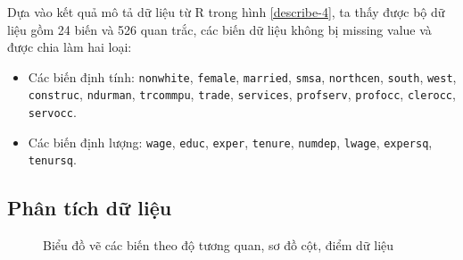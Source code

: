 Dựa vào kết quả mô tả dữ liệu từ R trong hình \ref{describe-4}, ta thấy được bộ dữ liệu gồm  24 biến và 526 quan trắc, các biến dữ liệu không bị missing value và được chia làm hai loại:
\begin{itemize}
	\item Các biến định tính: \texttt{nonwhite}, \texttt{female}, \texttt{married}, \texttt{smsa}, \texttt{northcen}, \texttt{south}, \texttt{west}, \texttt{construc}, \texttt{ndurman}, \texttt{trcommpu}, \texttt{trade}, \texttt{services}, \texttt{profserv}, \texttt{profocc}, \texttt{clerocc}, \texttt{servocc}.
	\item Các biến định lượng: \texttt{wage}, \texttt{educ}, \texttt{exper}, \texttt{tenure}, \texttt{numdep}, \texttt{lwage}, \texttt{expersq}, \texttt{tenursq}.
\end{itemize}

\subsection*{Phân tích dữ liệu}
\begin{figure}[H]
	\centering
	 \hfill
	\caption{Biểu đồ vẽ các biến theo độ tương quan, sơ đồ cột, điểm dữ liệu}
	\label{plot_data4}
\end{figure}

